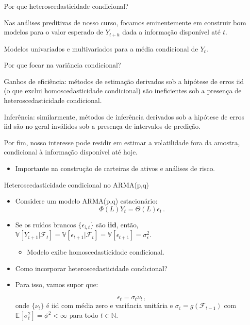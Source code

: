 \documentclass[11pt]{beamer}
\newenvironment{halfwideitemize}{\itemize\addtolength{\itemsep}{0.5em}}{\enditemize}
\newenvironment{halfwideenumerate}{\enumerate\addtolength{\itemsep}{0.5em}}{\endenumerate}
\begin{document}
\begin{frame}{Por que heteroscedasticidade condicional?}
\begin{halfwideitemize}
	\item Nas análises preditivas de nosso curso, focamos eminentemente em construir bom modelos para o valor esperado de $Y_{t+h}$ dada a informação disponível até $t$.
	\begin{halfwideitemize}
		\item Modelos univariados e multivariados para a {\color{blue}média condicional} de $Y_t$.
	\end{halfwideitemize}
		\item Por que focar na {\color{blue}variância condicional}?
	\begin{halfwideenumerate}

		\item Ganhos de eficiência: métodos de estimação derivados sob a hipótese de erros iid (o que exclui homoscedasticidade condicional) são {\color{blue}ineficientes} sob a presença de heteroscedasticidade condicional.
		\item Inferência: similarmente, métodos de inferência derivados sob a hipótese de erros iid são no geral {\color{blue}inválidos} sob a presença de intervalos de predição.
		\item  Por fim, nosso interesse pode residir em {\color{blue}estimar} a volatilidade fora da amostra, condicional à informação disponível até hoje.
		\begin{itemize}
			\item Importante na construção de carteiras de ativos e análises de risco.
		\end{itemize}
		\end{halfwideenumerate}
\end{halfwideitemize}
\end{frame}

\begin{frame}{Heteroscedasticidade condicional no ARMA(p,q)}
\begin{itemize}
	\item Considere um modelo ARMA(p,q) estacionário:
	$$\Phi(L)Y_t = \Theta(L)\epsilon_t \, .$$
	\item Se os ruídos brancos $\{\epsilon_{i,t}\}$ são \textbf{iid}, então, $\mathbb{V}[Y_{t+1}|\mathcal{F}_t] = \mathbb{V}[\epsilon_{t+1}|\mathcal{F}_t] = \mathbb{V}[\epsilon_{t+1}]  = \sigma^2_{\epsilon}$.
	\begin{itemize}
		\item Modelo exibe homoscedasticidade condicional.
	\end{itemize}
	\item Como incorporar heteroscedasticidade condicional?
		\item Para isso, vamos supor que:
		
		$$\epsilon_t = \sigma_t \nu_t  \, ,$$
		onde $\{\nu_t\}$ é iid  com  média zero e variância unitária e $\sigma_t = g(\mathcal{F}_{t-1})$ com $\mathbb{E}[\sigma^2_{t}] = \phi^2 < \infty$ para todo $t \in \mathbb{N}$.
\end{itemize}
\end{frame}
\end{document}

